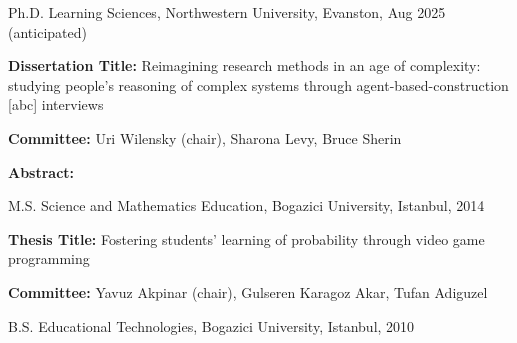 \documentclass[11pt,letterpaper]{report} %
\begin{document}
    \begin{tablist}

        \item[Ph.D.] \tab{}Learning Sciences, Northwestern University, Evanston, Aug 2025 (anticipated)
        \item[]      \tab{}\footnotesize\textbf{Dissertation Title:} Reimagining research methods in an age of complexity: studying people’s reasoning of complex systems through agent-based-construction [abc] interviews \\

        \vspace{4pt}

        \textbf{Committee:} Uri Wilensky (chair), Sharona Levy, Bruce Sherin \\

        \vspace{4pt}

        \textbf{Abstract:} \normalsize

        \vspace{12pt}

        \item[M.S.]  \tab{}Science and Mathematics Education, Bogazici University, Istanbul, 2014 \\

        \vspace{4pt}

        \item[]      \tab{}\footnotesize\textbf{Thesis Title:} Fostering students' learning of probability through video game programming \\

        \vspace{4pt}

        \textbf{Committee:} Yavuz Akpinar (chair), Gulseren Karagoz Akar, Tufan Adiguzel\normalsize

        \vspace{12pt}

        \item[B.S.]  \tab{}Educational Technologies, Bogazici University, Istanbul, 2010

    \end{tablist}
\end{document}
